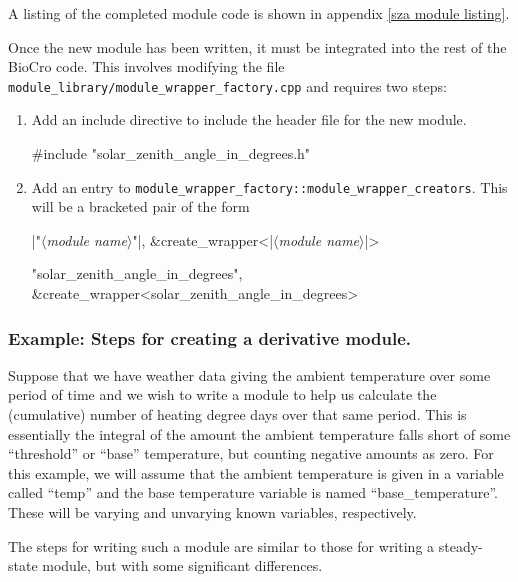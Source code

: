 \documentclass{article}\usepackage[]{graphicx}\usepackage[]{color}
\newcommand{\code}[1]{\lstinline[style=C++style]{#1}}
\newcommand{\placeholder}[1]{$\langle$\textrm{\textit{#1}}$\rangle$}
\newcommand{\stringplaceholder}[1]{{\color{stringcolor}"$\langle$\textrm{\textit{#1}}$\rangle$"}}
\begin{document}
A listing of the completed module code is shown in appendix \ref{sza
  module listing}.

Once the new module has been written, it must be integrated into the
rest of the BioCro code.  This involves modifying the file
\code{module_library/module_wrapper_factory.cpp} and requires two
steps:

\begin{enumerate}

\item Add an include directive to include the header file for the new module.
  \begin{example}[4]
    #include "solar_zenith_angle_in_degrees.h"
  \end{example}

\item Add an entry to
  \code{module_wrapper_factory::module_wrapper_creators}.  This
  will be a bracketed pair of the form
  \begin{C++listing}[4]
    {|\stringplaceholder{module name}|, &create_wrapper<|\placeholder{module name}|>}
  \end{C++listing}

  \begin{example}[4]
    {"solar_zenith_angle_in_degrees", &create_wrapper<solar_zenith_angle_in_degrees>}
  \end{example}

\end{enumerate}

\subsubsection{Example: Steps for creating a derivative module.}

Suppose that we have weather data giving the ambient temperature over
some period of time and we wish to write a module to help us calculate
the (cumulative) number of heating degree days over that same period.
This is essentially the integral of the amount the ambient temperature
falls short of some ``threshold'' or ``base'' temperature, but
counting negative amounts as zero.  For this example, we will assume
that the ambient temperature is given in a variable called ``temp''
and the base temperature variable is named ``base\_temperature''.
These will be varying and unvarying known variables, respectively.

The steps for writing such a module are similar to those for writing a
steady-state module, but with some significant differences.
\end{document}
